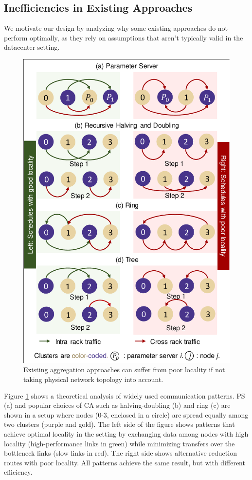 \subsection{Inefficiencies in Existing Approaches}
\label{sec:differentReductionAlgorithms}
We motivate our design by analyzing why some existing approaches do not perform optimally, as they rely on assumptions that aren't typically valid in the datacenter setting. 


\begin{figure}[t!]
	\centering
	\includegraphics[width=.5\linewidth, trim=3 3 3 3,clip]{Figures/poorlocalitywithexistingapproach.pdf}
	\caption{Existing aggregation approaches can suffer from poor locality if not taking physical network topology into account.} %
	\label{fig:poorlocalitywithexistingapproach}
\end{figure}

Figure \ref{fig:poorlocalitywithexistingapproach} shows a theoretical analysis of widely used communication patterns. PS (a) and popular choices of CA such as halving-doubling (b) and ring (c) are shown in a setup where nodes (0-3, enclosed in a circle) are spread equally among two clusters (purple and gold).  The left side of the figure shows patterns that achieve optimal locality in the setting by exchanging data among nodes with high locality (high-performance links in green) while minimizing transfers over the bottleneck links (slow links in red). The right side shows alternative reduction routes with poor locality. All patterns achieve the same result, but with different efficiency.

